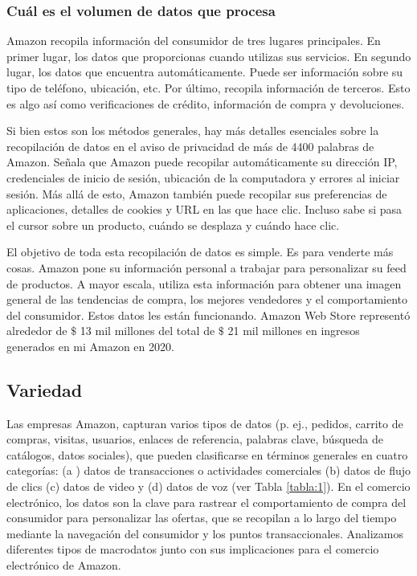 \subsubsection{Cuál es el volumen de datos que procesa}
Amazon recopila información del consumidor de tres lugares principales. En primer lugar, los datos que proporcionas cuando utilizas sus servicios. En segundo lugar, los datos que encuentra automáticamente. Puede ser información sobre su tipo de teléfono, ubicación, etc. Por último, recopila información de terceros. Esto es algo así como verificaciones de crédito, información de compra y devoluciones.

Si bien estos son los métodos generales, hay más detalles esenciales sobre la recopilación de datos en el aviso de privacidad de más de 4400 palabras de Amazon. Señala que Amazon puede recopilar automáticamente su dirección IP, credenciales de inicio de sesión, ubicación de la computadora y errores al iniciar sesión. Más allá de esto, Amazon también puede recopilar sus preferencias de aplicaciones, detalles de cookies y URL en las que hace clic. Incluso sabe si pasa el cursor sobre un producto, cuándo se desplaza y cuándo hace clic.

El objetivo de toda esta recopilación de datos es simple. Es para venderte más cosas. Amazon pone su información personal a trabajar para personalizar su feed de productos. A mayor escala, utiliza esta información para obtener una imagen general de las tendencias de compra, los mejores vendedores y el comportamiento del consumidor. Estos datos les están funcionando. Amazon Web Store representó alrededor de $\$$ 13 mil millones del total de $\$$ 21 mil millones en ingresos generados en mi Amazon en 2020.
\clearpage

\subsection{Variedad}
Las empresas Amazon, capturan varios tipos de datos (p. ej., pedidos, carrito de compras, visitas, usuarios, enlaces de referencia, palabras clave, búsqueda de catálogos, datos sociales), que pueden clasificarse en términos generales en cuatro categorías: (a ) datos de transacciones o actividades comerciales (b) datos de flujo de clics (c) datos de video y (d) datos de voz (ver Tabla \ref{tabla:1}). En el comercio electrónico, los datos son la clave para rastrear el comportamiento de compra del consumidor para personalizar las ofertas, que se recopilan a lo largo del tiempo mediante la navegación del consumidor y los puntos transaccionales. Analizamos  diferentes tipos de macrodatos junto con sus implicaciones para el comercio electrónico de Amazon.


